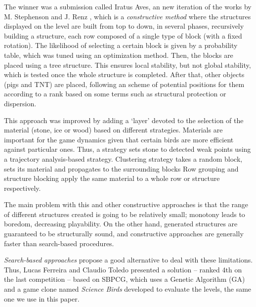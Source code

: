 \documentclass[sigconf]{acmart}
\begin{document}
The winner was a submission called Iratus Aves, an new iteration of
the works by M. Stephenson and J. Renz
\cite{stephenson2017generating,stephenson2016procedural}, which is a
\textit{constructive method} where the structures displayed on the
level are built from top to down, in several phases, recursively
building a structure, each row composed of a single type of block
(with a fixed rotation). The likelihood of selecting a certain block
is given by a probability table, which was tuned using an optimization
method. Then, the blocks are placed using a tree structure.
This ensures local stability, but not global stability, which
is tested once the whole structure is completed.  
After that, other objects (pigs and TNT) are placed, following an
scheme of potential positions for them according to a rank based on
some terms such as structural protection or dispersion. 

This approach was improved by adding a `layer' devoted to the
selection of the material (stone, ice or wood) based on different
strategies. Materials are important for the game dynamics given that certain 
birds are more
efficient against particular ones.
Thus, a strategy sets stone to detected weak
points using a trajectory analysis-based strategy.
Clustering strategy takes a random block, sets its material and
propagates to the surrounding blocks
Row grouping and structure blocking apply the same material to a
whole row or structure respectively. 

The main problem with this and other constructive approaches is that 
the range of different structures created is going to be relatively small; 
monotony
leads to boredom, decreasing playability. On the other hand, generated
structures are guaranteed to be structurally sound, and constructive
approaches are generally faster than search-based procedures.

\textit{Search-based approaches} propose a good alternative to deal
with these limitations. Thus, Lucas Ferreira and Claudio Toledo
\cite{ferreira2014search} presented a solution -- ranked 4th on the
last competition -- based on SBPCG, which uses a Genetic Algorithm
(GA) and a game clone named \textit{Science Birds} developed to
evaluate the levels, the same one we use in this paper.
\end{document}
